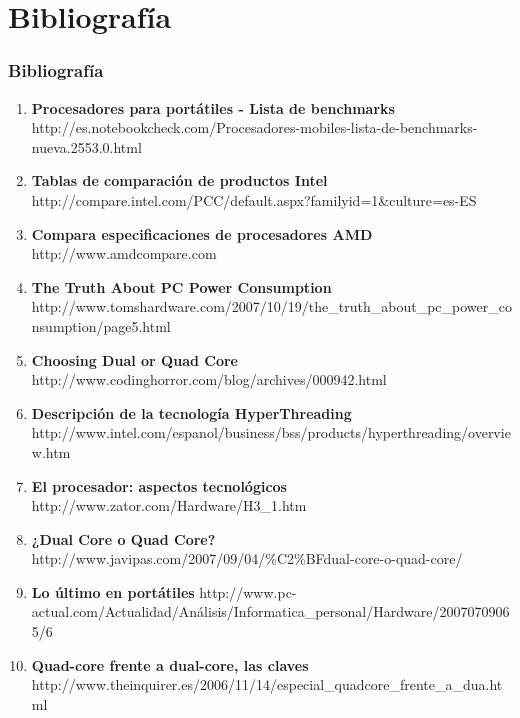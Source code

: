 \section{Bibliografía}
\frame
{
\frametitle{Bibliografía}
\tiny
\begin{enumerate}
 \item \textbf{Procesadores para portátiles - Lista de benchmarks}\newline
http://es.notebookcheck.com/Procesadores-mobiles-lista-de-benchmarks-nueva.2553.0.html

 \item \textbf{Tablas de comparación de productos Intel}\newline
http://compare.intel.com/PCC/default.aspx?familyid=1\&culture=es-ES

 \item \textbf{Compara especificaciones de procesadores AMD}\newline
http://www.amdcompare.com

 \item \textbf{The Truth About PC Power Consumption}\newline
http://www.tomshardware.com/2007/10/19/the\_truth\_about\_pc\_power\_consumption/page5.html

 \item \textbf{Choosing Dual or Quad Core}\newline
http://www.codinghorror.com/blog/archives/000942.html

 \item \textbf{Descripción de la tecnología HyperThreading}\newline
http://www.intel.com/espanol/business/bss/products/hyperthreading/overview.htm

 \item \textbf{El procesador: aspectos tecnológicos}\newline
http://www.zator.com/Hardware/H3\_1.htm

\item \textbf{¿Dual Core o Quad Core?}\newline
http://www.javipas.com/2007/09/04/\%C2\%BFdual-core-o-quad-core/

\item \textbf{Lo último en portátiles}\newline
http://www.pc-actual.com/Actualidad/Análisis/Informatica\_personal/Hardware/20070709065/6

\item \textbf{Quad-core frente a dual-core, las claves}\newline
http://www.theinquirer.es/2006/11/14/especial\_quadcore\_frente\_a\_dua.html


\end{enumerate}}
